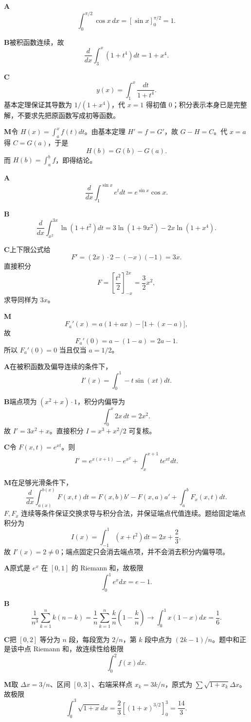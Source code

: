 \begin{solutionBox}
\textbf{A}\quad
\[
\int_0^{\pi/2}\cos x\,dx=[\sin x]_0^{\pi/2}=1.
\]

\textbf{B}\quad 被积函数连续，故
\[
\frac d{dx}\int_3^x(1+t^4)dt=1+x^4.
\]

\textbf{C}\quad
\[
y(x)=\int_1^x\frac{dt}{1+t^4}.
\]
基本定理保证其导数为 \(1/(1+x^4)\)，代 \(x=1\) 得初值 \(0\)；积分表示本身已是完整解，不要求先把原函数写成初等函数。

\textbf{M}\quad 令 \(H(x)=\int_a^xf(t)dt\)。由基本定理 \(H'=f=G'\)，故 \(G-H=C\)。代 \(x=a\) 得 \(C=G(a)\)，于是
\[
H(b)=G(b)-G(a).
\]
而 \(H(b)=\int_a^bf\)，即得结论。
\end{solutionBox}

\begin{solutionBox}
\textbf{A}\quad
\[
\frac d{dx}\int_1^{\sin x}e^tdt=e^{\sin x}\cos x.
\]

\textbf{B}\quad
\[
\frac d{dx}\int_{x^2}^{3x}\ln(1+t^2)dt
=3\ln(1+9x^2)-2x\ln(1+x^4).
\]

\textbf{C}\quad 上下限公式给
\[
F'=(2x)\cdot2-(-x)(-1)=3x.
\]
直接积分
\[
F=\left[\frac{t^2}{2}\right]_{-x}^{2x}
=\frac32x^2,
\]
求导同样为 \(3x\)。

\textbf{M}\quad
\[
F_a'(x)=a(1+ax)-\bigl[1+(x-a)\bigr],
\]
故
\[
F_a'(0)=a-(1-a)=2a-1.
\]
所以 \(F_a'(0)=0\) 当且仅当 \(a=1/2\)。
\end{solutionBox}

\begin{solutionBox}
\textbf{A}\quad 在被积函数及偏导连续的条件下，
\[
I'(x)=\int_0^1-t\sin(xt)dt.
\]

\textbf{B}\quad 端点项为 \((x^2+x)\cdot1\)，积分内偏导为
\[
\int_0^x2x\,dt=2x^2.
\]
故 \(I'=3x^2+x\)。直接积分 \(I=x^3+x^2/2\) 可复核。

\textbf{C}\quad 令 \(F(x,t)=e^{xt}\)。则
\[
I'=e^{x(x+1)}-e^{x^2}+\int_x^{x+1}t e^{xt}dt.
\]

\textbf{M}\quad 在足够光滑条件下，
\[
\frac d{dx}\int_{a(x)}^{b(x)}F(x,t)dt
=F(x,b)b'-F(x,a)a'+\int_a^bF_x(x,t)dt.
\]
\(F,F_x\) 连续等条件保证交换求导与积分合法，并保证端点代值连续。题给固定端点积分为
\[
I(x)=\int_{-1}^{1}(x+t^2)dt=2x+\frac23,
\]
故 \(I'(x)=2\ne0\)；端点固定只会消去端点项，并不会消去积分内偏导项。
\end{solutionBox}

\begin{solutionBox}
\textbf{A}\quad 原式是 \(e^x\) 在 \([0,1]\) 的 Riemann 和，故极限
\[
\int_0^1e^xdx=e-1.
\]

\textbf{B}\quad
\[
\frac1{n^3}\sum_{k=1}^nk(n-k)
=\frac1n\sum_{k=1}^n\frac kn\left(1-\frac kn\right)
\to\int_0^1x(1-x)dx=\frac16.
\]

\textbf{C}\quad 把 \([0,2]\) 等分为 \(n\) 段，每段宽为 \(2/n\)，第 \(k\) 段中点为 \((2k-1)/n\)。题中和正是该中点 Riemann 和，故连续性给极限
\[
\int_0^2f(x)dx.
\]

\textbf{M}\quad 取 \(\Delta x=3/n\)、区间 \([0,3]\)、右端采样点 \(x_k=3k/n\)，原式为 \(\sum\sqrt{1+x_k}\Delta x\)。故极限
\[
\int_0^3\sqrt{1+x}dx
=\frac23\left[(1+x)^{3/2}\right]_0^3
=\frac{14}{3}.
\]
\end{solutionBox}
